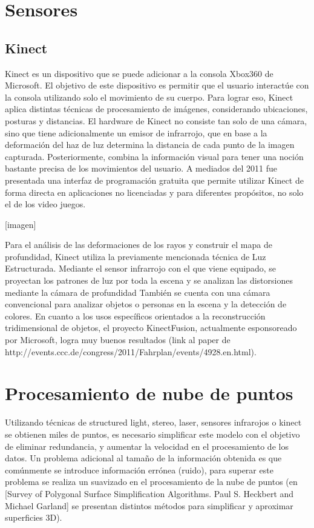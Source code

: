 \section{Sensores}
\subsection{Kinect}

Kinect es un dispositivo que se puede adicionar a la consola  Xbox360 de Microsoft. El objetivo de este dispositivo es permitir que el usuario interactúe con la consola utilizando solo el movimiento de su cuerpo. Para lograr eso, Kinect aplica distintas técnicas de procesamiento de imágenes, considerando ubicaciones, posturas y distancias. El hardware de Kinect no consiste tan solo de una cámara, sino que tiene adicionalmente un emisor de infrarrojo, que en base a la deformación del haz de luz determina la distancia de cada punto de la imagen capturada. Posteriormente, combina la información visual para tener una noción bastante precisa de los movimientos del usuario. A mediados del 2011 fue presentada una interfaz de programación gratuita que permite utilizar Kinect de forma directa en aplicaciones no licenciadas y para diferentes propósitos, no solo el de los video juegos.

[imagen]

Para el análisis de las deformaciones de los rayos y construir el mapa de profundidad, Kinect utiliza la previamente mencionada técnica de Luz Estructurada. Mediante el sensor infrarrojo con el que viene equipado, se proyectan los patrones de luz por toda la escena y se analizan las distorsiones mediante la cámara de profundidad
También se cuenta con una cámara convencional para analizar objetos o personas en la escena y la detección de colores.
En cuanto a los usos específicos orientados a la reconstrucción tridimensional de objetos, el proyecto KinectFusion, actualmente esponsoreado por Microsoft, logra muy buenos resultados (link al paper de http://events.ccc.de/congress/2011/Fahrplan/events/4928.en.html).

\section{Procesamiento de nube de puntos}

Utilizando técnicas de structured light, stereo, laser, sensores infrarojos o kinect se obtienen miles de puntos, es necesario simplificar este modelo con el objetivo de eliminar redundancia, y aumentar la velocidad en el procesamiento de los datos. Un problema adicional al tamaño de la información obtenida es que comúnmente se introduce información errónea (ruido), para superar este problema se realiza un suavizado en el procesamiento de la nube de puntos (en [Survey of Polygonal Surface Simplification Algorithms.  Paul S. Heckbert and Michael Garland] se presentan distintos métodos para simplificar y aproximar superficies 3D).

